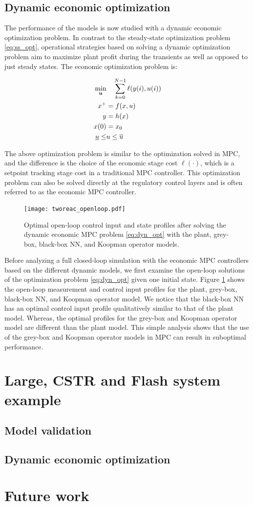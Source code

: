 \documentclass[10pt]{article}
\newcommand{\useq}{\mathbf{u}} \newcommand{\xseq}{\mathbf{x}}
\begin{document}
\subsection{Dynamic economic optimization}
The performance of the models is now studied with a dynamic economic optimization problem. In contrast to the steady-state optimization problem \eqref{eq:ss_opt}, operational strategies based on solving a dynamic optimization problem aim to maximize plant profit during the transients as well as opposed to just steady states. The economic optimization problem is:

\begin{align} \label{eq:dyn_opt}
  \underset{\useq}{\textnormal{min}} & \quad \sum_{k=0}^{N-1} \ell(y(i), u(i)) \\
  x^+ &= f(x, u) \nonumber \\ 
  y &= h(x) \nonumber \\
  x(0) &= x_0 \nonumber \\ 
  \underline{u} \leq &u \leq \overline{u} \nonumber
\end{align}

The above optimization problem is similar to the optimization solved in MPC, and the difference is the choice of the economic stage cost $\ell(\cdot)$, which is a setpoint tracking stage cost in a traditional MPC controller. This optimization problem can also be solved directly at the regulatory control layers and is often referred to as the economic MPC controller.

\begin{figure}[!h]
  \centering
  \texttt{[image: tworeac\_openloop.pdf]}
  \caption{Optimal open-loop control input and state profiles after solving the dynamic economic MPC problem \eqref{eq:dyn_opt} with the plant, grey-box, black-box NN, and Koopman operator models.}
  \label{fig:tworeac_openloop}
\end{figure}

Before analyzing a full closed-loop simulation with the economic MPC controllers based on the different dynamic models, we first examine the open-loop solutions of the optimization problem \eqref{eq:dyn_opt} given one initial state. Figure \ref{fig:tworeac_openloop} shows the open-loop measurement and control input profiles for the plant, grey-box, black-box NN, and Koopman operator model. We notice that the black-box NN has an optimal control input profile qualitatively similar to that of the plant model.
Whereas, the optimal profiles for the grey-box and Koopman operator model
are different than the plant model. This simple analysis shows that the use of the grey-box and Koopman operator models in MPC can result in suboptimal performance.

\section{Large, CSTR and Flash system example}

\subsection{Model validation}


\subsection{Dynamic economic optimization}


\section{Future work}
\end{document}
